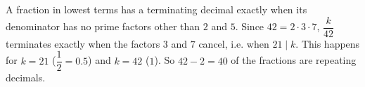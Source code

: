 A fraction in lowest terms has a terminating decimal exactly when its denominator has no prime factors other than $2$ and $5$. Since $42=2\cdot3\cdot7$, $\dfrac{k}{42}$ terminates exactly when the factors $3$ and $7$ cancel, i.e. when $21\mid k$. This happens for $k=21$ ($\dfrac12=0.5$) and $k=42$ ($1$). So $42-2=\boxed{40}$ of the fractions are repeating decimals.
